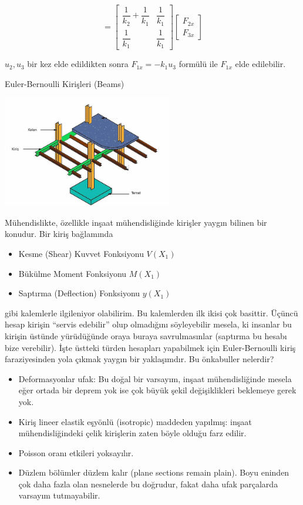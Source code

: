 \documentclass[12pt,fleqn]{article}\usepackage{../../common}
\begin{document}
$$
= \left[\begin{array}{cc}
\dfrac{1}{k_2} + \dfrac{1}{k_1} & \dfrac{1}{k_1} \\
\dfrac{1}{k_1} & \dfrac{1}{k_1} 
\end{array}\right]
\left[\begin{array}{c}
F_{2x} \\ F_{3x}
\end{array}\right]
$$

$u_2,u_3$ bir kez elde edildikten sonra $F_{1x} = -k_1 u_3$ formülü
ile $F_{1x}$ elde edilebilir.

Euler-Bernoulli Kirişleri (Beams)

\includegraphics[width=20em]{phy_020_strs_02_09.jpg}

Mühendislikte, özellikle inşaat mühendisliğinde kirişler yaygın bilinen
bir konudur. Bir kiriş bağlamında

\begin{itemize}
   \item Kesme (Shear) Kuvvet Fonksiyonu $V(X_1)$
   \item Bükülme Moment Fonksiyonu $M(X_1)$
   \item Saptırma (Deflection) Fonksiyonu $y(X_1)$
\end{itemize}

gibi kalemlerle ilgileniyor olabilirim. Bu kalemlerden ilk ikisi çok basittir.
Üçüncü hesap kirişin ``servis edebilir'' olup olmadığını söyleyebilir mesela, ki
insanlar bu kirişin üstünde yürüdüğünde oraya buraya savrulmasınlar (saptırma bu
hesabı bize verebilir). İşte üstteki türden hesapları yapabilmek için
Euler-Bernoulli kiriş faraziyesinden yola çıkmak yaygın bir yaklaşımdır.  Bu
önkabuller nelerdir?

\begin{itemize}
   \item Deformasyonlar ufak: Bu doğal bir varsayım, inşaat mühendisliğinde
     mesela eğer ortada bir deprem yok ise çok büyük şekil değişiklikleri
     beklemeye gerek yok. 
   \item Kiriş lineer elastik eşyönlü (isotropic) maddeden yapılmış: inşaat
     mühendisliğindeki çelik kirişlerin zaten böyle olduğu farz edilir.
   \item Poisson oranı etkileri yoksayılır.
   \item Düzlem bölümler düzlem kalır (plane sections remain plain). Boyu
     eninden çok daha fazla olan nesnelerde bu doğrudur, fakat daha ufak
     parçalarda varsayım tutmayabilir.
\end{itemize}
\end{document}
